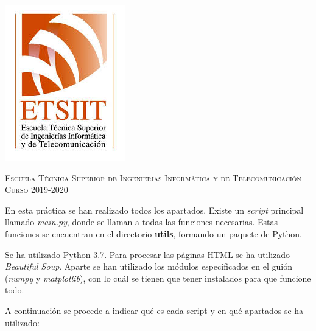 \documentclass[11pt,a4paper]{article}
\begin{document}
\begin{titlepage}
\begin{minipage}{\textwidth}
\includegraphics[scale=0.3]{img/etsiit.jpeg}

\vspace{0.7cm}
\textsc{Escuela Técnica Superior de Ingenierías Informática y de Telecomunicación}\\
\vspace{1cm}
\textsc{Curso 2019-2020}
\end{minipage}
\end{titlepage}


\setlength{\parskip}{1em}

En esta práctica se han realizado todos los apartados. Existe un \textit{script} principal llamado \textit{main.py},
donde se llaman a todas las funciones necesarias. Estas funciones se encuentran en el directorio \textbf{utils}, formando
un paquete de Python.

Se ha utilizado Python 3.7. Para procesar las páginas HTML se ha utilizado \textit{Beautiful Soup}. Aparte se han utilizado
los módulos especificados en el guión (\textit{numpy} y \textit{matplotlib}), con lo cuál se tienen que tener instalados
para que funcione todo.

A continuación se procede a indicar qué es cada script y en qué apartados se ha utilizado:
\end{document}
